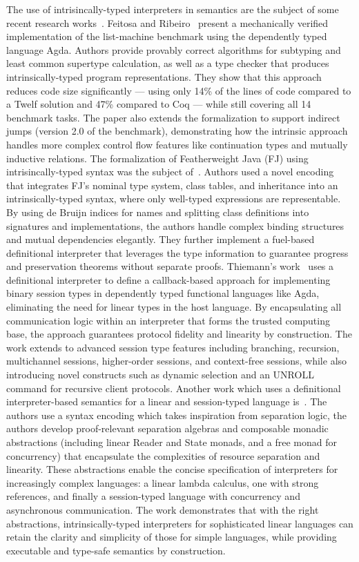 \documentclass[preprint,12pt]{elsarticle}
\theoremstyle{definition}
\begin{document}
The use of intrisincally-typed interpreters in semantics are the subject of
some recent research works~\cite{Feitosa19, Feitosa22, Thiemann23, Rouvoet20,
Rest22}.
Feitosa and Ribeiro~\cite{Feitosa22} present a mechanically verified
implementation of the list-machine benchmark using the dependently typed language
Agda. Authors provide provably correct algorithms for subtyping and least common
supertype calculation, as well as a type checker that produces intrinsically-typed
program representations. They show that this approach reduces code size significantly
— using only 14\% of the lines of code compared to a Twelf solution and 47\% compared
to Coq — while still covering all 14 benchmark tasks. The paper also extends the
formalization to support indirect jumps (version 2.0 of the benchmark), demonstrating
how the intrinsic approach handles more complex control flow features like continuation
types and mutually inductive relations. The formalization of Featherweight Java (FJ)
using intrisincally-typed syntax was the subject of~\cite{Feitosa19}.
Authors used a novel encoding that integrates FJ's nominal type system, class tables,
and inheritance into an intrinsically-typed syntax, where only well-typed expressions
are representable. By using de Bruijn indices for names and splitting class definitions
into signatures and implementations, the authors handle complex binding structures and
mutual dependencies elegantly. They further implement a fuel-based definitional
interpreter that leverages the type information to guarantee progress and preservation
theorems without separate proofs.
Thiemann's work~\cite{Thiemann23} uses a definitional interpreter to define a callback-based approach for
implementing binary session types in dependently typed functional languages like Agda,
eliminating the need for linear types in the host language. By encapsulating all
communication logic within an interpreter that forms the trusted computing base,
the approach guarantees protocol fidelity and linearity by construction. The work extends
to advanced session type features including branching, recursion, multichannel sessions,
higher-order sessions, and context-free sessions, while also introducing novel constructs
such as dynamic selection and an UNROLL command for recursive client protocols.
Another work which uses a definitional interpreter-based semantics for a linear and session-typed
language is~\cite{Rouvoet20}. The authors use a syntax encoding which takes inspiration from separation
logic, the authors develop proof-relevant separation algebras and composable
monadic abstractions (including linear Reader and State monads, and a free
monad for concurrency) that encapsulate the complexities of resource
separation and linearity. These abstractions enable the concise specification of
interpreters for increasingly complex languages: a linear lambda calculus,
one with strong references, and finally a session-typed language with
concurrency and asynchronous communication. The work demonstrates that
with the right abstractions, intrinsically-typed interpreters for sophisticated linear
languages can retain the clarity and simplicity of those for simple languages, while
providing executable and type-safe semantics by construction.
\end{document}
